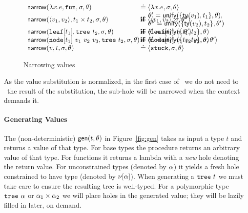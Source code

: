 \begin{figure}[t]
\[\begin{array}{lll}
\force{\efun{x}{e}}{\tfun}{\vsu}{\tsu} & \defeq \triple{\efun{x}{e}}{\vsu}{\tsu} \\
\force{\epair{v_1}{v_2}}{\tprod{t_1}{t_2}}{\vsu}{\tsu} & \defeq \triple{\epair{v_1}{v_2}}{\vsu}{\tsu''} & \hspace{-43.5mm} \textbf{if} \begin{array}{l} \tsu' = \unify{\{\typeof{v_1}, t_1\}}{\tsu},\\ \tsu'' = \unify{\{\typeof{v_2}, t_2\}}{\tsu'} \end{array} \\
\force{\vleaf{t_1}}{\ttree{t_2}}{\vsu}{\tsu} & \defeq \triple{\vleaf{t_1}}{\vsu}{\tsu'} & \hspace{-43.5mm} \textbf{if} \begin{array}{l} \tsu' = \unify{\{t_1, t_2\}}{\tsu} \end{array}\\
\force{\vnode{t_1}{v_1}{v_2}{v_3}}{\ttree{t_2}}{\vsu}{\tsu} \hspace{-3mm} & \defeq \triple{\vnode{t_1}{v_1}{v_2}{v_3}}{\vsu}{\tsu'} & \hspace{-43.5mm} \textbf{if} \begin{array}{l} \tsu' = \unify{\{t_1, t_2\}}{\tsu} \end{array} \\
\force{v}{t}{\vsu}{\tsu} & \defeq \triple{\stuck}{\vsu}{\tsu}
\end{array}
\]
\caption{Narrowing values}
\label{fig:narrow}
\end{figure}
%
As the value substitution is normalized, in the first case of \forcesym\ we
do not need to \forcesym\ the result of the substitution, the sub-hole
will be narrowed when the context demands it.

\paragraph{Generating Values} The (non-deterministic)
$\mathsf{gen}(t,\theta)$ in Figure~\ref{fig:gen} takes
as input a type $t$ and returns a value of that type.
%
For base types the procedure returns an arbitrary value of
that type.
%
For functions it returns a lambda with a \emph{new} hole
denoting the return value.
%
For unconstrained types (denoted
by $\alpha$) it yields a fresh hole constrained to have type
\thole (denoted by $\nu[\alpha]$).
%
When generating a $\mathtt{tree}\ t$ we must take care to ensure
the resulting tree is well-typed.
%
For a polymorphic type $\mathtt{tree}\ \alpha$ %
or $\alpha_1 \times \alpha_2$
we will place holes in the generated value; they will be lazily filled
in later, on demand.


